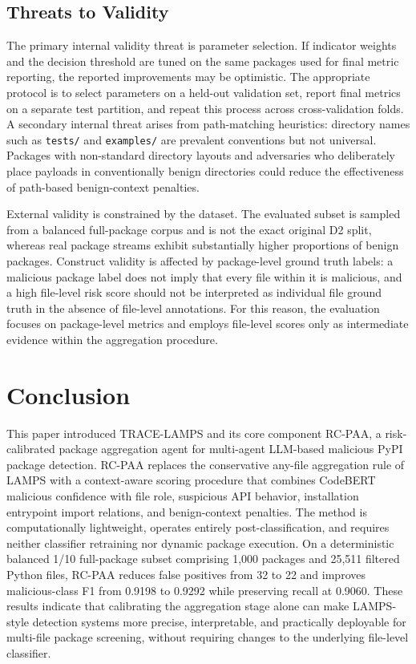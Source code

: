 \documentclass[conference,a4paper]{IEEEtran}
\newcommand{\rcpaa}{RC-PAA}
\newcommand{\tracelamps}{TRACE-LAMPS}
\newcommand{\codebert}{CodeBERT}
\begin{document}
\subsection{Threats to Validity}
The primary internal validity threat is parameter selection. If indicator weights and
the decision threshold are tuned on the same packages used for final metric reporting,
the reported improvements may be optimistic. The appropriate protocol is to select
parameters on a held-out validation set, report final metrics on a separate test
partition, and repeat this process across cross-validation folds. A secondary internal
threat arises from path-matching heuristics: directory names such as \texttt{tests/}
and \texttt{examples/} are prevalent conventions but not universal. Packages with
non-standard directory layouts and adversaries who deliberately place payloads in
conventionally benign directories could reduce the effectiveness of path-based
benign-context penalties.

External validity is constrained by the dataset. The evaluated subset is sampled from
a balanced full-package corpus and is not the exact original D2 split, whereas real
package streams exhibit substantially higher proportions of benign packages. Construct
validity is affected by package-level ground truth labels: a malicious package label
does not imply that every file within it is malicious, and a high file-level risk score
should not be interpreted as individual file ground truth in the absence of file-level
annotations. For this reason, the evaluation focuses on package-level metrics and
employs file-level scores only as intermediate evidence within the aggregation procedure.


\section{Conclusion}

This paper introduced \tracelamps{} and its core component \rcpaa{}, a risk-calibrated
package aggregation agent for multi-agent LLM-based malicious PyPI package detection.
\rcpaa{} replaces the conservative any-file aggregation rule of LAMPS with a
context-aware scoring procedure that combines \codebert{} malicious confidence with
file role, suspicious API behavior, installation entrypoint import relations, and
benign-context penalties. The method is computationally lightweight, operates entirely
post-classification, and requires neither classifier retraining nor dynamic package
execution. On a deterministic balanced 1/10 full-package subset comprising 1,000
packages and 25,511 filtered Python files, \rcpaa{} reduces false positives from 32
to 22 and improves malicious-class F1 from 0.9198 to 0.9292 while preserving recall
at 0.9060. These results indicate that calibrating the aggregation stage alone can
make LAMPS-style detection systems more precise, interpretable, and practically
deployable for multi-file package screening, without requiring changes to the underlying
file-level classifier.
\end{document}
